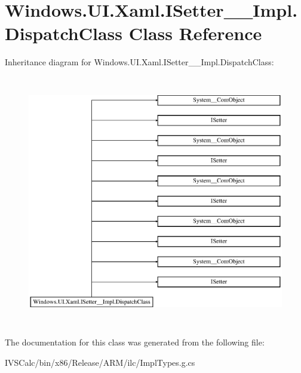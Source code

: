 \hypertarget{class_windows_1_1_u_i_1_1_xaml_1_1_i_setter_____impl_1_1_dispatch_class}{}\section{Windows.\+U\+I.\+Xaml.\+I\+Setter\+\_\+\+\_\+\+Impl.\+Dispatch\+Class Class Reference}
\label{class_windows_1_1_u_i_1_1_xaml_1_1_i_setter_____impl_1_1_dispatch_class}
Inheritance diagram for Windows.\+U\+I.\+Xaml.\+I\+Setter\+\_\+\+\_\+\+Impl.\+Dispatch\+Class\+:\begin{figure}[H]
\begin{center}
\leavevmode
\includegraphics[height=11.000000cm]{class_windows_1_1_u_i_1_1_xaml_1_1_i_setter_____impl_1_1_dispatch_class}
\end{center}
\end{figure}


The documentation for this class was generated from the following file\+:\begin{DoxyCompactItemize}
\item 
I\+V\+S\+Calc/bin/x86/\+Release/\+A\+R\+M/ilc/Impl\+Types.\+g.\+cs\end{DoxyCompactItemize}
